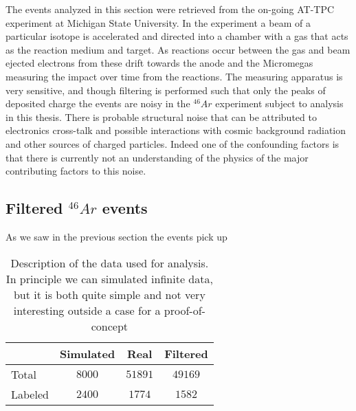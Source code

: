 The events analyzed in this section were retrieved from the on-going AT-TPC experiment at Michigan State University. In the experiment a beam of a particular isotope is accelerated and directed into a chamber with a gas that acts as the reaction medium and target. As reactions occur between the gas and beam ejected electrons from these drift towards the anode and the Micromegas measuring the impact over time from the reactions. The measuring apparatus is very sensitive, and though filtering is performed such that only the peaks of deposited charge the events are noisy in the ${}^{46}Ar$ experiment subject to analysis in this thesis. There is probable structural noise that can be attributed to electronics cross-talk and possible interactions with cosmic background radiation and other sources of charged particles. Indeed one of the confounding factors is that there is currently not an understanding of the physics of the major contributing factors to this noise. 



\subsection{Filtered \texorpdfstring{${}^46Ar$}{46Ar} events}

As we saw in the previous section the events pick up 


\begin{table}
\centering
\begin{tabular}{lccc}
\toprule
{} & Simulated & Real & Filtered \\
\midrule
Total &  $8000$ & $51891$ & $49169$ \\
Labeled & $2400$ & $1774$ &  $1582$ \\ 
\bottomrule
\end{tabular}
\caption{Description of the data used for analysis. In principle we can simulated infinite data, but it is both quite simple and not very interesting outside a case for a proof-of-concept}

\end{table}


